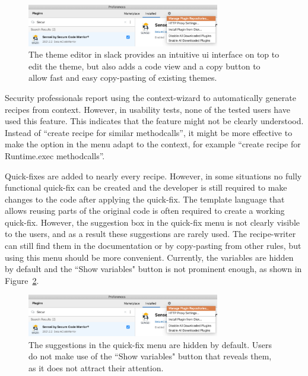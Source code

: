 \begin{figure}
  \centering
  \includegraphics[width=0.75\textwidth,page=16]{04-tools/figures/figures2.pdf}
  
  \caption[Slack theme editor]{The theme editor in slack provides an intuitive \gls{ui} interface on top to edit the theme, but also adds a code view and a copy button to allow fast and easy copy-pasting of existing themes.}
  \label{fig:slacktheme} 
\end{figure}

Security professionals report using the context-wizard to automatically generate recipes from context.
However, in usability tests, none of the tested users have used this feature.
This indicates that the feature might not be clearly understood.
Instead of “create recipe for similar methodcalls”, it might be more effective to make the option in the menu adapt to the context, for example “create recipe for Runtime.exec methodcalls”.

Quick-fixes are added to nearly every recipe.
However, in some situations no fully functional quick-fix can be created and the developer is still required to make changes to the code after applying the quick-fix.
The template language that allows reusing parts of the original code is often required to create a working quick-fix.
However, the suggestion box in the quick-fix menu is not clearly visible to the users, and as a result these suggestions are rarely used.
The recipe-writer can still find them in the documentation or by copy-pasting from other rules, but using this menu should be more convenient.
Currently, the variables are hidden by default and the ``Show variables" button is not prominent enough, as shown in Figure~\ref{fig:showvariables}.

\begin{figure}
  \centering
  \includegraphics[width=0.75\textwidth,page=15]{04-tools/figures/figures2.pdf}
  \caption[Show variables button in the fix menu]{The suggestions in the quick-fix menu are hidden by default. Users do not make use of the ``Show variables" button that reveals them, as it does not attract their attention.}
  \label{fig:showvariables} 
\end{figure}

